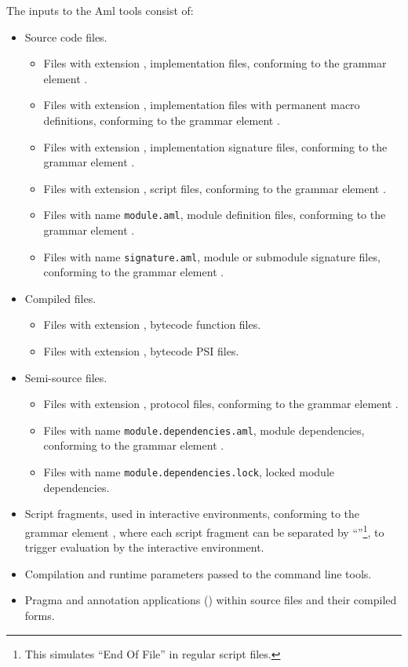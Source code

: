 The inputs to the Aml tools consist of: 
\begin{itemize}
  \item Source code files. 
    \begin{itemize}
      \item Files with extension , implementation files, conforming to the grammar element . 
      \item Files with extension , implementation files with permanent macro definitions, conforming to the grammar element . 
      \item Files with extension , implementation signature files, conforming to the grammar element . 
      \item Files with extension , script files, conforming to the grammar element . 
      \item Files with name \lstinline[deletekeywords={module}]!module.aml!, module definition files, conforming to the grammar element . 
      \item Files with name \lstinline[deletekeywords={signature}]!signature.aml!, module or submodule signature files, conforming to the grammar element . 
    \end{itemize}
  \item Compiled files. 
    \begin{itemize}
      \item Files with extension , bytecode function files. 
      \item Files with extension , bytecode PSI files. 
    \end{itemize}
  \item Semi-source files. 
    \begin{itemize}
      \item Files with extension , protocol files, conforming to the grammar element . 
      \item Files with name \lstinline[deletekeywords={module}]!module.dependencies.aml!, module dependencies, conforming to the grammar element . 
      \item Files with name \lstinline[deletekeywords={module}]!module.dependencies.lock!, locked module dependencies. 
    \end{itemize}
  \item Script fragments, used in interactive environments, conforming to the grammar element , where each script fragment can be separated by ``\code{;;}''\footnote{This simulates ``End Of File'' in regular script files.}, to trigger evaluation by the interactive environment. 
  \item Compilation and runtime parameters passed to the command line tools. 
  \item Pragma and annotation applications () within source files and their compiled forms. 
\end{itemize}

